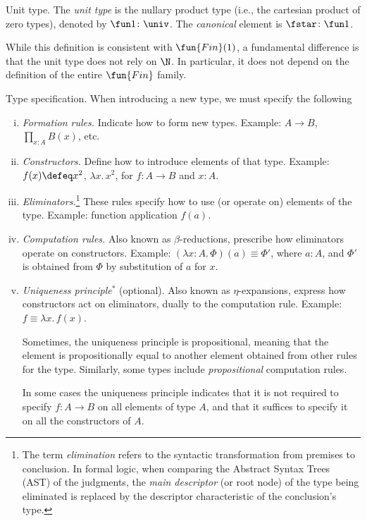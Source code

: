 \begin{lpar}{Unit type.}\label{lpar:unit-type}
    The \textsl{unit type} is the nullary product type (i.e., the cartesian product of zero types), denoted by $\fun1\colon\univ$. The \textsl{canonical} element is $\fstar\colon\fun1$.

    While this definition is consistent with $\fun{Fin}(1)$, a fundamental difference is that the unit type does not rely on $\N$. In particular, it does not depend on the definition of the entire $\fun{Fin}$ family.
\end{lpar}

\begin{lpar}{Type specification.}\label{lpar:type-spec}
    When introducing a new type, we must specify the following
    \begin{enumerate}[i),font=\scshape]
        \item \textit{Formation rules.} Indicate how to form new types. Example: $A\to B$, $\prod_{x\colon A}B(x)$, etc.

        \item \textit{Constructors.} Define how to introduce elements of that type. Example: $f(x)\defeq x^2$, $\lambda x.\,x^2$, for $f\colon A\to B$ and $x\colon A$.

        \item \textit{Eliminators.}\footnote{The term \textit{elimination} refers to the syntactic transformation from premises to conclusion. In formal logic, when comparing the Abstract Syntax Trees (AST) of the judgments, the \textit{main descriptor} (or root node) of the type being eliminated is replaced by the descriptor characteristic of the conclusion's type.} These rules specify how to use (or operate on) elements of the type. Example: function application $f(a)$.

        \item \textit{Computation rules.} Also known as $\beta$-reductions, prescribe how eliminators operate on constructors. Example: $(\lambda x\colon A.\,\Phi)(a)\equiv\Phi'$, where $a\colon A$, and $\Phi'$ is obtained from $\Phi$ by substitution of $a$ for $x$.

        \item \textit{Uniqueness principle$^*$} (optional). Also known as $\eta$-expansions, express how constructors act on eliminators, dually to the computation rule. Example: $f\equiv\lambda x.\,f(x)$.

        Sometimes, the uniqueness principle is propositional, meaning that the element is propositionally equal to another element obtained from other rules for the type. Similarly, some types include \textit{propositional} computation rules.

        In some cases the uniqueness principle indicates that it is not required to specify $f\colon A\to B$ on all elements of type $A$, and that it suffices to specify it on all the constructors of $A$.
    \end{enumerate}
\end{lpar}

